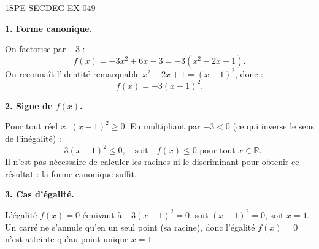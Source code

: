 \begin{corrige}{1SPE-SECDEG-EX-049}

\textbf{1. Forme canonique.}


On factorise par $-3$ :
\[
f(x) = -3x^2 + 6x - 3 = -3(x^2 - 2x + 1).
\]
On reconnaît l'identité remarquable $x^2 - 2x + 1 = (x-1)^2$, donc :
\[
f(x) = -3(x - 1)^2.
\]

\medskip
\textbf{2. Signe de $f(x)$.}


Pour tout réel $x$, $(x-1)^2 \geqslant 0$. En multipliant par $-3 < 0$ (ce qui inverse le sens de l'inégalité) :
\[
-3(x-1)^2 \leqslant 0, \quad \text{soit} \quad f(x) \leqslant 0 \text{ pour tout } x \in \mathbb{R}.
\]
Il n'est pas nécessaire de calculer les racines ni le discriminant pour obtenir ce résultat : la forme canonique suffit.

\medskip
\textbf{3. Cas d'égalité.}

L'égalité $f(x) = 0$ équivaut à $-3(x-1)^2 = 0$, soit $(x-1)^2 = 0$, soit $x = 1$. Un carré ne s'annule qu'en un seul point (sa racine), donc l'égalité $f(x) = 0$ n'est atteinte qu'au point unique $x = 1$.

\end{corrige}

